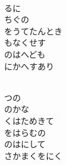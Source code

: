 \documentclass[10pt,b5j]{tarticle} %
\begin{document}
\begin{enumerate}
\begin{minipage}[c]{\blocksize}
        \vspace{\linespace}
        \item~\\
        るに\\
        ちぐの\\
        をうてたんとき\\
        もなくせす\\
        のはへども\\
        にかへすあり
        
        \vspace{\linespace}
        \item~\\
        つの\\
        のかな\\
        くはためきて\\
        をはらむの\\
        のはにして\\
        さかまくをにく
    
    \end{minipage}
\end{enumerate} %
\end{document}
